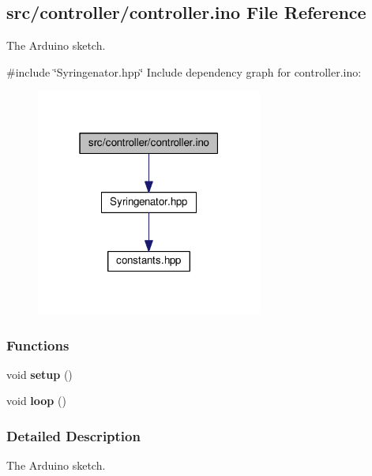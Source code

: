 \hypertarget{controller_8ino}{}\subsection{src/controller/controller.ino File Reference}
\label{controller_8ino}


The Arduino sketch.  


{\ttfamily \#include \char`\"{}Syringenator.\+hpp\char`\"{}}\newline
Include dependency graph for controller.\+ino\+:
\nopagebreak
\begin{figure}[H]
\begin{center}
\leavevmode
\includegraphics[width=211pt]{controller_8ino__incl}
\end{center}
\end{figure}
\subsubsection*{Functions}
\begin{DoxyCompactItemize}
\item 
\mbox{\label{controller_8ino_a4fc01d736fe50cf5b977f755b675f11d}} 
void {\bfseries setup} ()
\item 
\mbox{\label{controller_8ino_afe461d27b9c48d5921c00d521181f12f}} 
void {\bfseries loop} ()
\end{DoxyCompactItemize}


\subsubsection{Detailed Description}
The Arduino sketch. 

